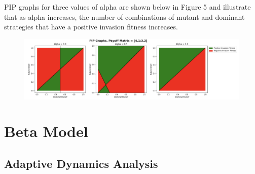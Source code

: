 \documentclass[]{llncs}
\begin{document}
PIP graphs for three values of alpha are shown below in Figure 5 and illustrate that as alpha increases, the number of combinations of mutant and dominant strategies that have a positive invasion fitness increases. 

\begin{figure}
\centering
\includegraphics[width=15cm]{images/pip_alpha}
\caption{ }
\end{figure}

\section{Beta Model}

\subsection{Adaptive Dynamics Analysis}
\end{document}

